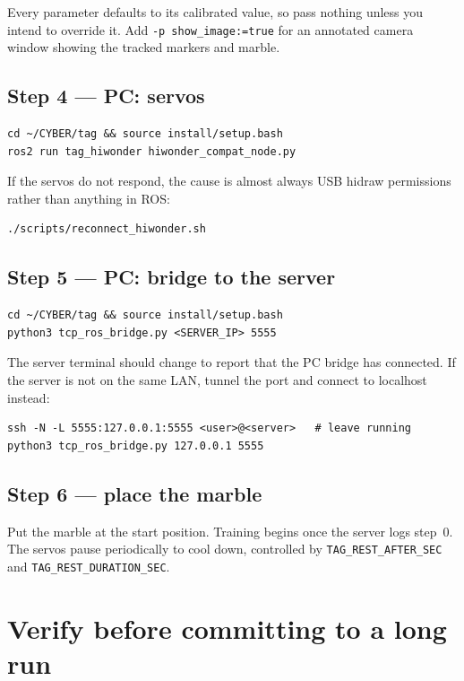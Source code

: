 \documentclass[11pt,a4paper]{article}
\newcommand{\cmd}[1]{\texttt{\small #1}}
\begin{document}
Every parameter defaults to its calibrated value, so pass nothing unless you
intend to override it. Add \cmd{-p show\_image:=true} for an annotated camera
window showing the tracked markers and marble.

\subsection*{Step 4 --- PC: servos}

\begin{lstlisting}
cd ~/CYBER/tag && source install/setup.bash
ros2 run tag_hiwonder hiwonder_compat_node.py
\end{lstlisting}

If the servos do not respond, the cause is almost always USB hidraw permissions
rather than anything in ROS:

\begin{lstlisting}
./scripts/reconnect_hiwonder.sh
\end{lstlisting}

\subsection*{Step 5 --- PC: bridge to the server}

\begin{lstlisting}
cd ~/CYBER/tag && source install/setup.bash
python3 tcp_ros_bridge.py <SERVER_IP> 5555
\end{lstlisting}

The server terminal should change to report that the PC bridge has connected. If
the server is not on the same LAN, tunnel the port and connect to localhost
instead:

\begin{lstlisting}
ssh -N -L 5555:127.0.0.1:5555 <user>@<server>   # leave running
python3 tcp_ros_bridge.py 127.0.0.1 5555
\end{lstlisting}

\subsection*{Step 6 --- place the marble}

Put the marble at the start position. Training begins once the server logs
step~0. The servos pause periodically to cool down, controlled by
\cmd{TAG\_REST\_AFTER\_SEC} and \cmd{TAG\_REST\_DURATION\_SEC}.

\section{Verify before committing to a long run}
\label{sec:verify}
\end{document}
